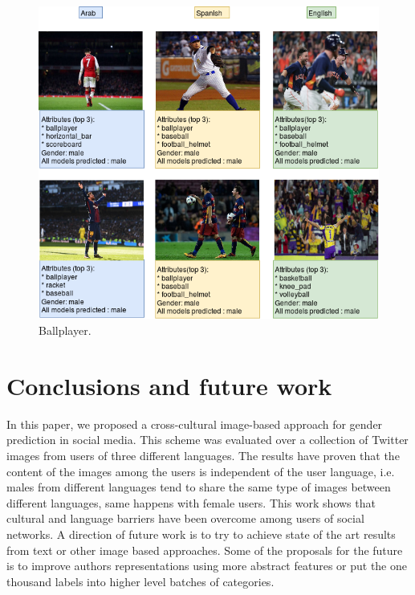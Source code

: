 \documentclass[runningheads]{llncs}
\begin{document}
\begin{figure}[!ht]
    \centering
    \includegraphics[scale=0.37]{img/best_gi/ball_player_gi.png}
    \caption{Ballplayer.}
    \label{fig:ballplayer}
\end{figure}

\newpage
\section{Conclusions and future work}
In this paper, we proposed a cross-cultural image-based approach for gender prediction in social media.
This scheme was evaluated over a collection of Twitter images
from users of three different languages. The results 
have proven that the content of the images 
among the users is independent of the user language,
i.e. males from different languages
tend to share the same type of images between different languages, same happens with female users. This work shows that cultural and language barriers have been overcome among users of social networks.
A direction of future work is to try to achieve state of the art results from text or other image based approaches. Some of the proposals for the future is to improve authors representations
using more abstract features or put the one thousand labels into higher level batches of categories.
\end{document}
